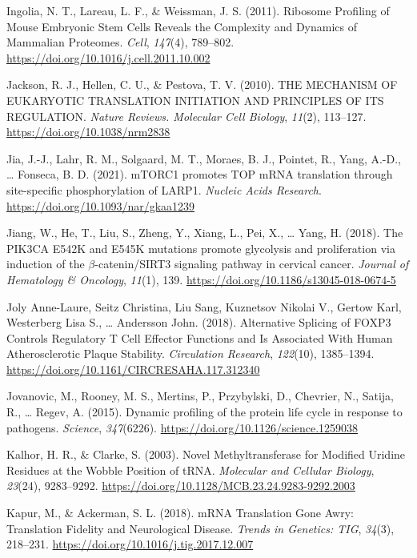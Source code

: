 \documentclass[12pt,openany]{book}
\begin{document}
\hypertarget{ref-Ingolia2011}{}
Ingolia, N. T., Lareau, L. F., \& Weissman, J. S. (2011). Ribosome
Profiling of Mouse Embryonic Stem Cells Reveals the Complexity and
Dynamics of Mammalian Proteomes. \emph{Cell}, \emph{147}(4), 789--802.
\url{https://doi.org/10.1016/j.cell.2011.10.002}

\hypertarget{ref-Jackson2010a}{}
Jackson, R. J., Hellen, C. U., \& Pestova, T. V. (2010). THE MECHANISM
OF EUKARYOTIC TRANSLATION INITIATION AND PRINCIPLES OF ITS REGULATION.
\emph{Nature Reviews. Molecular Cell Biology}, \emph{11}(2), 113--127.
\url{https://doi.org/10.1038/nrm2838}

\hypertarget{ref-Jia2021}{}
Jia, J.-J., Lahr, R. M., Solgaard, M. T., Moraes, B. J., Pointet, R.,
Yang, A.-D., \ldots{} Fonseca, B. D. (2021). mTORC1 promotes TOP mRNA
translation through site-specific phosphorylation of LARP1.
\emph{Nucleic Acids Research}.
\url{https://doi.org/10.1093/nar/gkaa1239}

\hypertarget{ref-Jiang2018}{}
Jiang, W., He, T., Liu, S., Zheng, Y., Xiang, L., Pei, X., \ldots{}
Yang, H. (2018). The PIK3CA E542K and E545K mutations promote glycolysis
and proliferation via induction of the \(\beta\)-catenin/SIRT3 signaling
pathway in cervical cancer. \emph{Journal of Hematology \& Oncology},
\emph{11}(1), 139. \url{https://doi.org/10.1186/s13045-018-0674-5}

\hypertarget{ref-JolyAnne-Laure2018}{}
Joly Anne-Laure, Seitz Christina, Liu Sang, Kuznetsov Nikolai V., Gertow
Karl, Westerberg Lisa S., \ldots{} Andersson John. (2018). Alternative
Splicing of FOXP3 Controls Regulatory T Cell Effector Functions and Is
Associated With Human Atherosclerotic Plaque Stability.
\emph{Circulation Research}, \emph{122}(10), 1385--1394.
\url{https://doi.org/10.1161/CIRCRESAHA.117.312340}

\hypertarget{ref-Jovanovic2015}{}
Jovanovic, M., Rooney, M. S., Mertins, P., Przybylski, D., Chevrier, N.,
Satija, R., \ldots{} Regev, A. (2015). Dynamic profiling of the protein
life cycle in response to pathogens. \emph{Science}, \emph{347}(6226).
\url{https://doi.org/10.1126/science.1259038}

\hypertarget{ref-Kalhor2003}{}
Kalhor, H. R., \& Clarke, S. (2003). Novel Methyltransferase for
Modified Uridine Residues at the Wobble Position of tRNA.
\emph{Molecular and Cellular Biology}, \emph{23}(24), 9283--9292.
\url{https://doi.org/10.1128/MCB.23.24.9283-9292.2003}

\hypertarget{ref-Kapur2018}{}
Kapur, M., \& Ackerman, S. L. (2018). mRNA Translation Gone Awry:
Translation Fidelity and Neurological Disease. \emph{Trends in Genetics:
TIG}, \emph{34}(3), 218--231.
\url{https://doi.org/10.1016/j.tig.2017.12.007}
\end{document}
